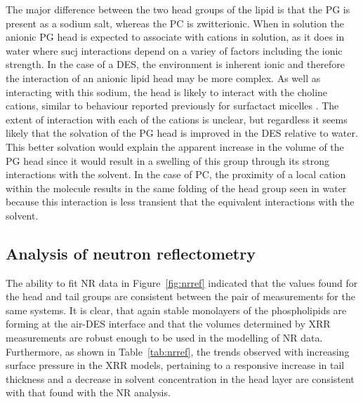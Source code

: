 The major difference between the two head groups of the lipid is that the PG is present as a sodium salt, whereas the PC is zwitterionic.
When in solution the anionic PG head is expected to associate with cations in solution, as it does in water \cite{grigoriev_effect_1999} where sucj interactions depend on a variey of factors including the ionic strength.
In the case of a DES, the environment is inherent ionic and therefore the interaction of an anionic lipid head may be more complex.
As well as interacting with this sodium, the head is likely to interact with the choline cations, similar to behaviour reported previously for surfactact micelles \cite{sanchez-fernandez_counterion_2018}.
The extent of interaction with each of the cations is unclear, but regardless it seems likely that the solvation of the PG head is improved in the DES relative to water.
This better solvation would explain the apparent increase in the volume of the PG head since it would result in a swelling of this group through its strong interactions with the solvent.
In the case of PC, the proximity of a local cation within the molecule results in the same folding of the head group seen in water because this interaction is less transient that the equivalent interactions with the solvent.

\subsection{Analysis of neutron reflectometry}
The ability to fit NR data in Figure~\ref{fig:nrref} indicated that the values found for the head and tail groups are consistent between the pair of measurements for the same systems.
It is clear, that again stable monolayers of the phospholipids are forming at the air-DES interface and that the volumes determined by XRR measurements are robust enough to be used in the modelling of NR data.
Furthermore, as shown in Table~\ref{tab:nrref}, the trends observed with increasing surface pressure in the XRR models, pertaining to a responsive increase in tail thickness and a decrease in solvent concentration in the head layer are consistent with that found with the NR analysis.

